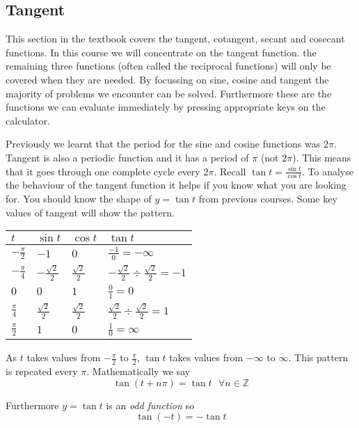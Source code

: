 \subsection{Tangent}
This section in the textbook covers the tangent, cotangent, secant and cosecant functions. In this course we will concentrate on the tangent function. the remaining three functions (often called the reciprocal functions) will only be covered when they are needed. By focussing on sine, cosine and tangent the majority of problems we encounter can be solved. Furthermore these are the functions we can evaluate immediately by pressing appropriate keys on the calculator. 

Previously we learnt that the period for the sine and cosine functions was $2 \pi $. Tangent is also a periodic function and it has a period of $\pi $ (not $2 \pi $). This means that it goes through one complete cycle every $2 \pi $. Recall $\tan  t =\frac{\sin  t}{\cos  t}$. To analyse the behaviour of the tangent function it helps if you know what you are looking for. You should know the shape of $y =\tan  t$ from previous courses. Some key values of tangent will show the pattern. 


\begin{tabular}[c]{|l|l|l|l|}\hline
	$t$  & $\sin  t$  & $\cos  t$  & $\tan  t$  \\
	\hline
	$ -\frac{\pi }{2}$  & $ -1$  & $0$  & $\frac{ -1}{0} = -\infty $  \\
	\hline
	$ -\frac{\pi }{4}$  & $ -\frac{\sqrt{2}}{2}$  & $\frac{\sqrt{2}}{2}$  & $ -\frac{\sqrt{2}}{2} \div \frac{\sqrt{2}}{2} = -1$  \\
	\hline
	$0$  & $0$  & $1$  & $\frac{0}{1} =0$  \\
	\hline
	$\frac{\pi }{4}$  & $\frac{\sqrt{2}}{2}$  & $\frac{\sqrt{2}}{2}$  & $\frac{\sqrt{2}}{2} \div \frac{\sqrt{2}}{2} =1$  \\
	\hline
	$\frac{\pi }{2}$  & $1$  & $0$  & $\frac{1}{0} =\infty $  \\
	\hline
\end{tabular}

As $t$ takes values from $ -\frac{\pi }{2}$ to $\frac{\pi }{2}$, $\tan  t$ takes values from $ -\infty $ to $\infty $. This pattern is repeated every $\pi $. Mathematically we say
\begin{equation*}\tan  \left (t +n \pi \right ) =\tan  t\text{\  } \forall n \in \mathbb{Z}
\end{equation*}

Furthermore $y =\tan  t$ is an \emph{odd function} so
\begin{equation*}\tan  \left ( -t\right ) = -\tan  t
\end{equation*}

